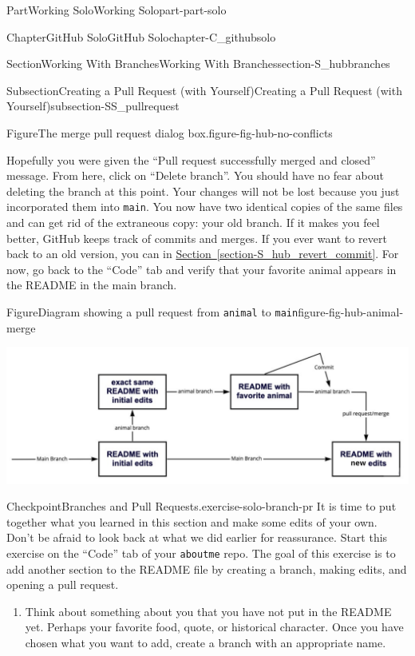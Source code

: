 \documentclass[oneside,10pt,]{book}
\newcommand{\xreffont}{\relax}
\newcommand{\mono}[1]{\texttt{#1}}
\begin{document}
\begin{partptx}{Part}{Working Solo}{}{Working Solo}{}{}{part-part-solo}
\begin{chapterptx}{Chapter}{GitHub Solo}{}{GitHub Solo}{}{}{chapter-C_githubsolo}
\begin{sectionptx}{Section}{Working With Branches}{}{Working With Branches}{}{}{section-S_hubbranches}
\begin{subsectionptx}{Subsection}{Creating a Pull Request (with Yourself)}{}{Creating a Pull Request (with Yourself)}{}{}{subsection-SS_pullrequest}
\begin{figureptx}{Figure}{The merge pull request dialog box.}{figure-fig-hub-no-conflicts}{}
\begin{image}{0.05}{0.9}{0.05}{}
\end{image}%
\tcblower
\end{figureptx}%
Hopefully you were given the ``Pull request successfully merged and closed'' message. From here, click on ``Delete branch''. You should have no fear about deleting the branch at this point. Your changes will not be lost because you just incorporated them into \mono{main}. You now have two identical copies of the same files and can get rid of the extraneous copy: your old branch. If it makes you feel better, GitHub keeps track of commits and merges. If you ever want to revert back to an old version, you can in \hyperref[section-S_hub_revert_commit]{Section~{\xreffont\ref{section-S_hub_revert_commit}}}. For now, go back to the ``Code'' tab and verify that your favorite animal appears in the README in the main branch.%
\begin{figureptx}{Figure}{Diagram showing a pull request from \mono{animal} to \mono{main}}{figure-fig-hub-animal-merge}{}%
\begin{image}{0.05}{0.9}{0.05}{}%
\includegraphics[width=\linewidth]{external/hub_animal_merge.pdf}
\end{image}%
\tcblower
\end{figureptx}%
\begin{inlineexercise}{Checkpoint}{Branches and Pull Requests.}{exercise-solo-branch-pr}%
It is time to put together what you learned in this section and make some edits of your own. Don't be afraid to look back at what we did earlier for reassurance. Start this exercise on the ``Code'' tab of your \mono{aboutme} repo. The goal of this exercise is to add another section to the README file by creating a branch, making edits, and opening a pull request.%
\begin{enumerate}[font=\bfseries,label=(\alph*),ref=\alph*]%
\item{}Think about something about you that you have not put in the README yet. Perhaps your favorite food, quote, or historical character. Once you have chosen what you want to add, create a branch with an appropriate name.%

\end{enumerate}
\end{inlineexercise}
\end{subsectionptx}
\end{sectionptx}
\end{chapterptx}
\end{partptx}
\end{document}
